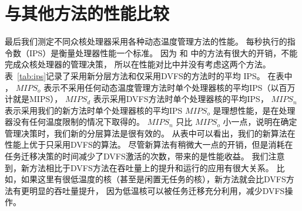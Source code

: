  \section{与其他方法的性能比较}\label{sec:ips_comp}
 
 最后我们测定不同众核处理器采用各种动态温度管理方法的性能。
 每秒执行的指令数（IPS）是衡量处理器性能一个标准。
 因为\cite{MaWang:APCCAS'14} 和 \cite{Hanumaiah:TCAD'11}中的方法有很大的开销，不能完成众核处理器的管理决策，
 所以在性能对比中并没有考虑这两个方法。
 表~\ref{tab:ips}记录了采用新分层方法和仅采用DVFS的方法时的平均 IPS。
 在表中 ， $MIPS_o$ 表示不采用任何动态温度管理方法时单个处理器核的平均IPS（以百万计就是MIPS），
 $MIPS_d$ 表示采用DVFS方法时单个处理器核的平均IPS，
 $MIPS_n$ 表示采用我们的新方法时单个处理器核的平均IPS
 $MIPS_o$ 是理想性能，是在处理器没有任何温度限制的情况下取得的。
  $MIPS_n$ 只比  $MIPS_o$ 小一点，说明在确定管理决策时，我们新的分层算法是很有效的。
  从表中可以看出，我们的新算法在性能上优于只采用DVFS的算法。
  尽管新算法有稍微大一点的开销，但是消耗在任务迁移决策的时间减少了DVFS激活的次数，带来的是性能收益。
  我们注意到，新方法相比于DVFS方法在吞吐量上的提升和运行的应用有很大关系。
  比如，如果这里有很低温度的核（甚至是闲置无任务的核），新方法就会比DVFS方法有更明显的吞吐量提升，
  因为低温核可以被任务迁移充分利用，减少DVFS操作。
  
 
 
 
 
 
 


























